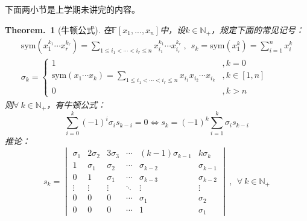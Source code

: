 \documentclass[zihao=5,UTF8]{report}
\theoremstyle{mystyle} %
\newtheorem{theorem}{Theorem.\,}
\begin{document}
{\par\color{gray}\small
下面两小节是上学期未讲完的内容。
\par}
\begin{theorem}[牛顿公式]\label{牛顿公式}
在$\mathbb{F}[x_1,...,x_n]$中，设$k \in \mathbb{N}_+$，规定下面的常见记号：
\begin{gather*}
    \text{sym}(x_1^{k_1}\cdots x_r^{k_r}) = \sum_{1 \le i_1 < \cdots <i_r \le n }x_{i_1}^{k_1}\cdots x_{i_r}^{k_r} \ ,\ \ s_k = \text{sym}(x_1^{k}) = \sum_{i=1}^{n}x_i^k\\
    \sigma_k =\begin{cases}
        1 &, k=0\\
        \text{sym}(x_1\cdots x_k) =
        \underset{1 \le i_1 < \cdots <i_r \le n }{\sum}x_{i_1}x_{i_2}\cdots x_{i_k} &, k \in [1,n]\\
        0&, k>n 
    \end{cases}
\end{gather*}
则$\forall\ k \in \mathbb{N}_+$，有牛顿公式：
\begin{equation*}
    \sum_{i=0}^{k}(-1)^i\sigma_i s_{k-i} = 0 \Longleftrightarrow s_k = (-1)^k\sum_{i=1}^{k}\sigma_{i}s_{k-i}
\end{equation*}
推论：
\begin{equation*}
    s_k = 
    \begin{vmatrix}
        \sigma_1 & 2\sigma_2 & 3\sigma_3 & \cdots & (k-1)\sigma_{k-1} & k\sigma_{k}\\
        1 & \sigma_1 & \sigma_2  & \cdots & \sigma_{k-2} & \sigma_{k-1}\\
        0 & 1 & \sigma_1 & \cdots  & \sigma_{k-3} & \sigma_{k-2}\\
        \vdots &  \vdots &  \vdots & \ddots  &  \vdots &  \vdots\\
        0 & 0 & 0 & \cdots  & \sigma_1 & \sigma_2\\
        0 & 0 & 0 & \cdots & 1 & \sigma_1 
    \end{vmatrix}\ ,\ \ \forall\  k \in \mathbb{N}_+
\end{equation*}
\end{theorem}
\end{document}

